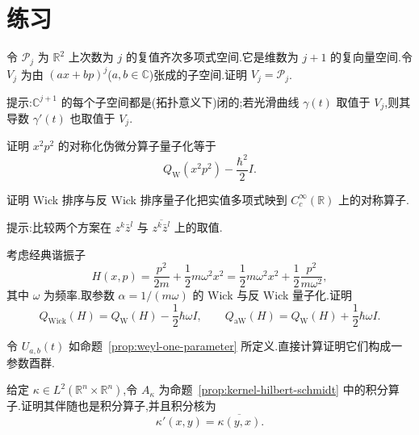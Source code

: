 {\section{练习}
\label{sec:chapter13-exercises}

\begin{exercise}[齐次多项式的张成]\label{ex:homogeneous-span}
令 $\mathcal P_j$ 为 $\mathbb R^2$ 上次数为 $j$ 的复值齐次多项式空间.它是维数为 $j+1$ 的复向量空间.令 $V_j$ 为由 $(ax+bp)^j$($a,b\in\mathbb C$)张成的子空间.证明 $V_j=\mathcal P_j$.

提示:$\mathbb C^{j+1}$ 的每个子空间都是(拓扑意义下)闭的;若光滑曲线 $\gamma(t)$ 取值于 $V_j$,则其导数 $\gamma'(t)$ 也取值于 $V_j$.
\end{exercise}

\begin{exercise}\label{ex:symmetrized-weyl}
证明 $x^2p^2$ 的对称化伪微分算子量子化等于
\[
Q_{\mathrm W}(x^2p^2)-\frac{\hbar^2}{2}I.
\]
\end{exercise}

\begin{exercise}\label{ex:wick-symmetric}
证明 Wick 排序与反 Wick 排序量子化把实值多项式映到 $C_c^\infty(\mathbb R)$ 上的对称算子.

提示:比较两个方案在 $z^k\bar z^l$ 与 $\overline{z^k\bar z^l}$ 上的取值.
\end{exercise}

\begin{exercise}[谐振子的三种量子化]\label{ex:quantization-harmonic-oscillator}
考虑经典谐振子
\[
H(x,p)=\frac{p^2}{2m}+\frac12m\omega^2x^2
=\frac12m\omega^2x^2+\frac12\frac{p^2}{m\omega^2},
\]
其中 $\omega$ 为频率.取参数 $\alpha=1/(m\omega)$ 的 Wick 与反 Wick 量子化.证明
\[
Q_{\mathrm{Wick}}(H)=Q_{\mathrm W}(H)-\frac12\hbar\omega I,
\qquad
Q_{\mathrm{aW}}(H)=Q_{\mathrm W}(H)+\frac12\hbar\omega I.
\]
\end{exercise}

\begin{exercise}\label{ex:weyl-one-parameter-group}
令 $U_{a,b}(t)$ 如命题~\ref{prop:weyl-one-parameter} 所定义.直接计算证明它们构成一参数酉群.
\end{exercise}

\begin{exercise}[积分算子的伴随]\label{ex:kernel-adjoint}
给定 $\kappa\in L^2(\mathbb R^n\times\mathbb R^n)$,令 $A_\kappa$ 为命题~\ref{prop:kernel-hilbert-schmidt} 中的积分算子.证明其伴随也是积分算子,并且积分核为
\[
\kappa'(x,y)=\overline{\kappa(y,x)}.
\]
\end{exercise}

}
